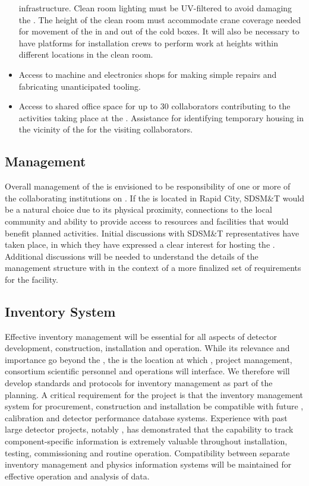 \begin{itemize}
    infrastructure.  Clean room lighting must be UV-filtered to avoid
    damaging the .  The height of the clean room must
    accommodate crane coverage needed for movement of the  in and
    out of the cold boxes.  It will also be necessary to have
    platforms for installation crews to perform work at heights within
    different locations in the clean room.
  \item Access to machine and electronics shops for making simple
    repairs and fabricating unanticipated tooling.
  \item Access to shared office space for up to \num{30} collaborators
    contributing to the activities taking place at the .
    Assistance for identifying temporary housing in the vicinity of
    the  for the visiting collaborators.
\end{itemize}

\subsection{Management}

Overall management of the  is envisioned to be
responsibility of one or more of the collaborating institutions on
.  If the  is located in Rapid City, SDSM\&T
would be a natural choice due to its physical proximity, connections
to the local community and ability to provide access to resources and
facilities that would benefit planned  activities.  Initial
discussions with SDSM\&T representatives have taken place, in which
they have expressed a clear interest for hosting the .
Additional discussions will be needed to understand the details of the
 management structure with in the context of a more
finalized set of requirements for the facility.

\subsection{Inventory System}

Effective inventory management will be essential for all aspects of
 detector development, construction, installation and
operation.  While its relevance and importance go beyond the
, the  is the location at
which ,  project management, consortium
scientific personnel and \surf operations will interface.  We therefore
will develop standards and protocols for inventory management as part
of the  planning.  A critical requirement for the project
is that the inventory management system for procurement, construction
and installation be compatible with future , calibration and
detector performance database systems.  Experience with past large
detector projects, notably \nova, has demonstrated that the capability
to track component-specific information is extremely valuable
throughout installation, testing, commissioning and routine operation.
Compatibility between separate inventory management and physics
information systems will be maintained for effective operation and
analysis of  data.


